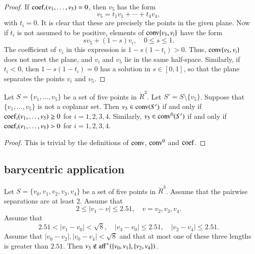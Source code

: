 \begin{proof}
If ${\operatorname{coef}}_i(v_1,\ldots,v_5)=0$, then $v_5$
has the form
	$$
	v_5 = t_1 v_1 + \cdots + t_4 v_4,
	$$
with $t_i=0$.  It is clear that these are
precisely the points in the given plane.
Now if $t_i$ is not assumed to be positive, 
elements of
${\operatorname{conv}}\{v_5,v_i\}$ have the form
	$$s v_5 + (1-s) v_i,\quad 0\le s \le 1.$$
The coefficient of $v_i$ in this expression
is $1-s(1-t_i)>0$.  Thus, ${\operatorname{conv}}\{v_5,v_i\}$
does not meet the plane, and $v_i$ and $v_5$
lie in the same half-space.  Similarly,
if $t_i<0$, then $1-s(1-t_i)=0$ has a solution
in $s\in[0,1]$, so that the plane separates the
points $v_i$ and $v_5$.
\end{proof}
\newpage

\begin{lemma}
Let $S=\{v_1,\ldots,v_5\}$ be
a set of five points in $\ring{R}^3$.  Let $S'=S\setminus\{v_5\}$.
Suppose
that $\{v_1,\ldots,v_5\}$ is not a coplanar
set.  Then $v_5\in{\operatorname{conv}}(S')$ if and only
if  
${\operatorname{coef}}_i(v_1,\ldots,v_5)\ge0$ 
for $i=1,2,3,4$.
Similarly, $v_5\in{\operatorname{conv}}^0(S')$ if and only
if  
${\operatorname{coef}}_i(v_1,\ldots,v_5)>0$ 
for $i=1,2,3,4$.
\end{lemma}

\begin{proof}  This is trivial by the definitions
of ${\operatorname{conv}}$, ${\operatorname{conv}}^0$ and ${\operatorname{coef}}$.
\end{proof}

\newpage







\subsection{barycentric application}

\begin{lemma}
Let $S=\{v_0,v_1,v_2,v_3,v_4\}$ be a set of five points in $\ring{R}^3$.
Assume that the pairwise separations are at least $2$.
Assume that
  $$2\le |v_1-v|\le 2.51,\quad v = v_2,v_3,v_4.$$
Assume that
  $$2.51 < |v_1-v_0| < \sqrt8,\quad |v_3-v_0|\le 2.51,
   \quad |v_2-v_4|\le2.51.$$
Assume that $|v_0-v_2|,|v_0-v_4|<\sqrt8$ and that
at most one of these three lengths is greater than $2.51$.
Then $v_3\not\in{\operatorname{aff}}^+(\{v_0,v_1\},\{v_2,v_4\})$.
\end{lemma}



